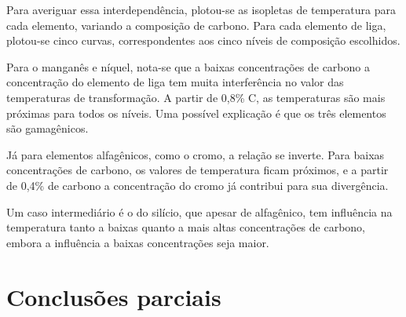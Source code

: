 \documentclass[hidelinks,brazil,dissertacao,epusp]{usp}
\begin{document}
Para averiguar essa interdependência, plotou-se as isopletas de temperatura para cada elemento, variando a composição de carbono. Para cada elemento de liga, plotou-se cinco curvas, correspondentes aos cinco níveis de composição escolhidos.

Para o manganês e níquel, nota-se que a baixas concentrações de carbono a concentração do elemento de liga tem muita interferência no valor das temperaturas de transformação. A partir de 0,8\% C, as temperaturas são mais próximas para todos os níveis. Uma possível explicação é que os três elementos são gamagênicos.

Já para elementos alfagênicos, como o cromo, a relação se inverte. Para baixas concentrações de carbono, os valores de temperatura ficam próximos, e a partir de 0,4\% de carbono a concentração do cromo já contribui para sua divergência.

Um caso intermediário é o do silício, que apesar de alfagênico, tem influência na temperatura tanto a baixas quanto a mais altas concentrações de carbono, embora a influência a baixas concentrações seja maior.

\chapter{Conclusões parciais}
\end{document}
